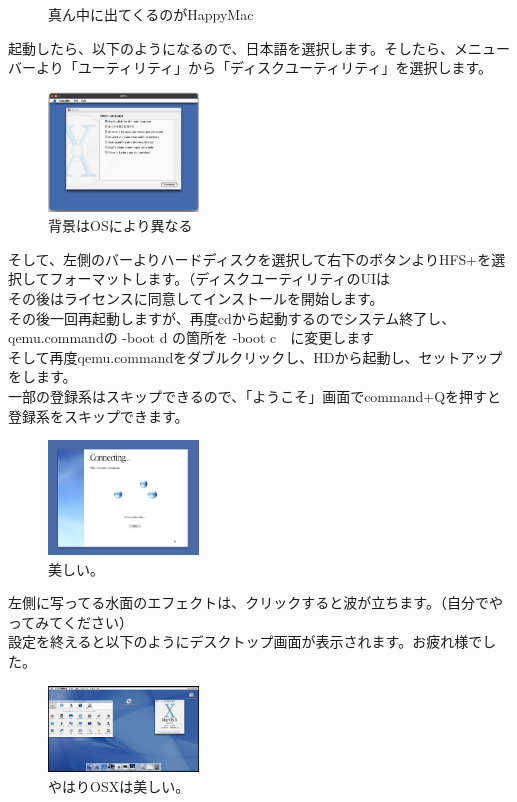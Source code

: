 \documentclass[b5paper,9pt,platex,dvipdfmx]{jsarticle}
\begin{document}
\begin{multicols*}{3}
{\begin{figure}[H]
  \caption{真ん中に出てくるのがHappyMac}
\end{figure}
起動したら、以下のようになるので、日本語を選択します。そしたら、メニューバーより「ユーティリティ」から「ディスクユーティリティ」を選択します。\\
\begin{figure}[H]
  \centering
  \includegraphics[width=4cm]{osx-cd.png}
  \caption{背景はOSにより異なる}
\end{figure}
そして、左側のバーよりハードディスクを選択して右下のボタンよりHFS+を選択してフォーマットします。（ディスクユーティリティのUIは\\
その後はライセンスに同意してインストールを開始します。\\
その後一回再起動しますが、再度cdから起動するのでシステム終了し、qemu.commandの -boot d の箇所を -boot c　に変更します\\
そして再度qemu.commandをダブルクリックし、HDから起動し、セットアップをします。\\
一部の登録系はスキップできるので、「ようこそ」画面でcommand+Qを押すと登録系をスキップできます。\\
\begin{figure}[H]
  \centering
  \includegraphics[width=4cm]{osx-connect.png}
  \caption{美しい。}
\end{figure}
左側に写ってる水面のエフェクトは、クリックすると波が立ちます。（自分でやってみてください）\\
設定を終えると以下のようにデスクトップ画面が表示されます。お疲れ様でした。\\
\begin{figure}[H]
  \centering
  \includegraphics[width=4cm]{osxdesktop.png}
  \caption{やはりOSXは美しい。}
\end{figure}
}
\end{multicols*}
\end{document}
